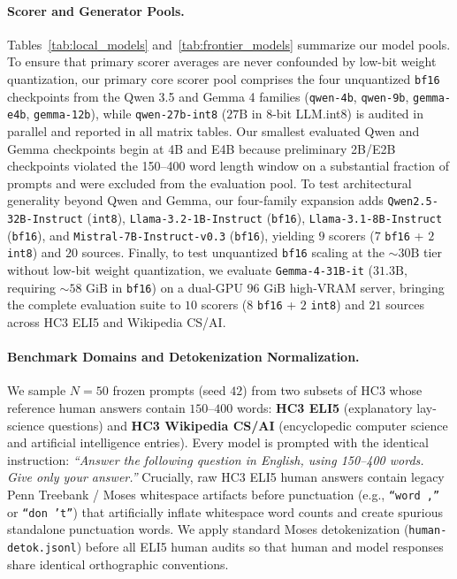 \documentclass[11pt]{article}
\begin{document}
\paragraph{Scorer and Generator Pools.}
Tables~\ref{tab:local_models} and~\ref{tab:frontier_models} summarize our model pools. To ensure that primary scorer averages are never confounded by low-bit weight quantization, our primary core scorer pool comprises the four unquantized \texttt{bf16} checkpoints from the Qwen 3.5 and Gemma 4 families (\texttt{qwen-4b}, \texttt{qwen-9b}, \texttt{gemma-e4b}, \texttt{gemma-12b}), while \texttt{qwen-27b-int8} ($27\text{B}$ in 8-bit LLM.int8) is audited in parallel and reported in all matrix tables. Our smallest evaluated Qwen and Gemma checkpoints begin at 4B and E4B because preliminary 2B/E2B checkpoints violated the 150--400 word length window on a substantial fraction of prompts and were excluded from the evaluation pool. To test architectural generality beyond Qwen and Gemma, our four-family expansion adds \texttt{Qwen2.5-32B-Instruct} (\texttt{int8}), \texttt{Llama-3.2-1B-Instruct} (\texttt{bf16}), \texttt{Llama-3.1-8B-Instruct} (\texttt{bf16}), and \texttt{Mistral-7B-Instruct-v0.3} (\texttt{bf16}), yielding $9$ scorers ($7$ \texttt{bf16} + $2$ \texttt{int8}) and $20$ sources. Finally, to test unquantized \texttt{bf16} scaling at the $\sim 30\text{B}$ tier without low-bit weight quantization, we evaluate \texttt{Gemma-4-31B-it} ($31.3\text{B}$, requiring $\sim 58\text{ GiB}$ in \texttt{bf16}) on a dual-GPU $96\text{ GiB}$ high-VRAM server, bringing the complete evaluation suite to $10$ scorers ($8$ \texttt{bf16} + $2$ \texttt{int8}) and $21$ sources across HC3 ELI5 and Wikipedia CS/AI.

\paragraph{Benchmark Domains and Detokenization Normalization.}
We sample $N=50$ frozen prompts (seed $42$) from two subsets of HC3 \citep{guo2023hc3} whose reference human answers contain $150$--$400$ words: \textbf{HC3 ELI5} (explanatory lay-science questions) and \textbf{HC3 Wikipedia CS/AI} (encyclopedic computer science and artificial intelligence entries). Every model is prompted with the identical instruction: \emph{``Answer the following question in English, using 150--400 words. Give only your answer.''} Crucially, raw HC3 ELI5 human answers contain legacy Penn Treebank / Moses whitespace artifacts before punctuation (e.g., \texttt{``word ,''} or \texttt{``don 't''}) that artificially inflate whitespace word counts and create spurious standalone punctuation words. We apply standard Moses detokenization (\texttt{human-detok.jsonl}) before all ELI5 human audits so that human and model responses share identical orthographic conventions.
\end{document}
